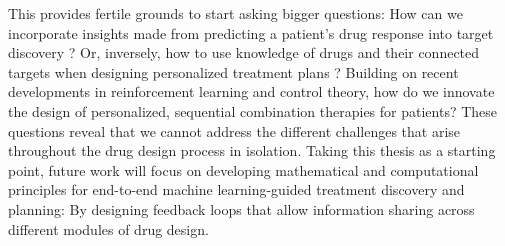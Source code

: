 This provides fertile grounds to start asking bigger questions: How can we incorporate insights made from predicting a patient's drug response into target discovery \citep{huang2022artificial}? Or, inversely, how to use knowledge of drugs and their connected targets when designing personalized treatment plans \citep{nilforoshan2023zero}? Building on recent developments in reinforcement learning and control theory, how do we innovate the design of personalized, sequential combination therapies for patients?
These questions reveal that we cannot address the different challenges that arise throughout the drug design process in isolation.
Taking this thesis as a starting point, future work will focus on developing mathematical and computational principles for end-to-end machine learning-guided treatment discovery and planning:
By designing feedback loops that allow information sharing across different modules of drug design. \\


